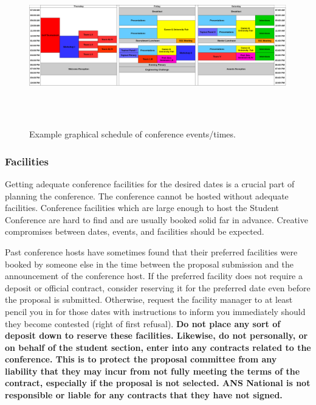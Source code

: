 \documentclass[12pt]{article}
\begin{document}
\begin{figure}[h]
\centering
\includegraphics[width=17cm, height=7cm]{example_schedule.png}
\caption{Example graphical schedule of conference events/times.}
\label{fig:example_graphical_schedule}
\end{figure}

\subsubsection{Facilities}\label{sec:conference_facilities}
Getting adequate conference facilities for the desired dates is a crucial part of planning the conference. The conference cannot be hosted without adequate facilities.
Conference facilities which are large enough to host the Student Conference are hard to
find and are usually booked solid far in advance. Creative compromises between dates,
events, and facilities should be expected.

Past conference hosts have sometimes found that their preferred facilities were booked by
someone else in the time between the proposal submission and the announcement of the
conference host. If the preferred facility does not require a deposit or official
contract, consider reserving it for the preferred date even before the proposal is submitted. 
Otherwise, request the facility manager to at least pencil you in for those
dates with instructions to inform you immediately should they become contested (right of first refusal). 
\textbf{Do not place any sort of deposit down to reserve these facilities.
Likewise, do not personally, or on behalf of the student section, enter into any contracts related to the conference. 
This is to protect the proposal committee from any liability that they may incur from not fully meeting the terms of the contract, especially if the proposal is not selected.
ANS National is not responsible or liable for any contracts that they have not signed.}
\end{document}
